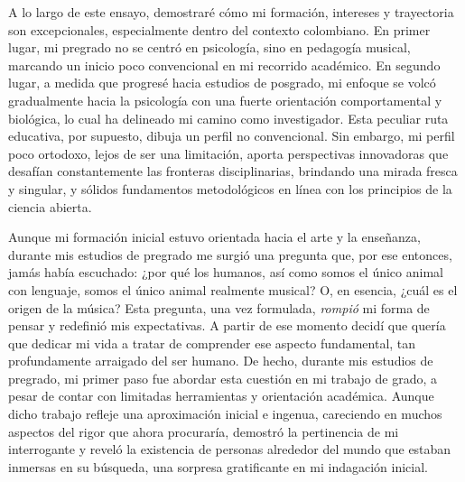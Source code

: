 \documentclass[11pt,a4paper,]{awesome-cv}
\begin{document}
\begin{small}

A lo largo de este ensayo, demostraré cómo mi formación, intereses y trayectoria son excepcionales, especialmente dentro del contexto colombiano. En primer lugar, mi pregrado no se centró en psicología, sino en pedagogía musical, marcando un inicio poco convencional en mi recorrido académico. En segundo lugar, a medida que progresé hacia estudios de posgrado, mi enfoque se volcó gradualmente hacia la psicología con una fuerte orientación comportamental y biológica, lo cual ha delineado mi camino como investigador. Esta peculiar ruta educativa, por supuesto, dibuja un perfil no convencional. Sin embargo, mi perfil poco ortodoxo, lejos de ser una limitación, aporta perspectivas innovadoras que desafían constantemente las fronteras disciplinarias, brindando una mirada fresca y singular, y sólidos fundamentos metodológicos en línea con los principios de la ciencia abierta.

Aunque mi formación inicial estuvo orientada hacia el arte y la enseñanza, durante mis estudios de pregrado me surgió una pregunta que, por ese entonces, jamás había escuchado: ¿por qué los humanos, así como somos el único animal con lenguaje, somos el único animal realmente musical? O, en esencia, ¿cuál es el origen de la música? Esta pregunta, una vez formulada, \textit{rompió} mi forma de pensar y redefinió mis expectativas. A partir de ese momento decidí que quería que dedicar mi vida a tratar de comprender ese aspecto fundamental, tan profundamente arraigado del ser humano. De hecho, durante mis estudios de pregrado, mi primer paso fue abordar esta cuestión en mi trabajo de grado, a pesar de contar con limitadas herramientas y orientación académica. Aunque dicho trabajo \autocite[eventualmente publicado en][]{Leongomez2008} refleje una aproximación inicial e ingenua, careciendo en muchos aspectos del rigor que ahora procuraría, demostró la pertinencia de mi interrogante y reveló la existencia de personas alrededor del mundo que estaban inmersas en su búsqueda, una sorpresa gratificante en mi indagación inicial.


\end{small}
\end{document}

